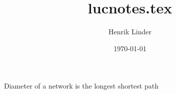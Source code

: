 \documentclass{article}
\title{lucnotes.tex }
\author{Henrik Linder}
\date{\today}
\begin{document}
\maketitle




Diameter of a network is the longest shortest path 
\end{document}
